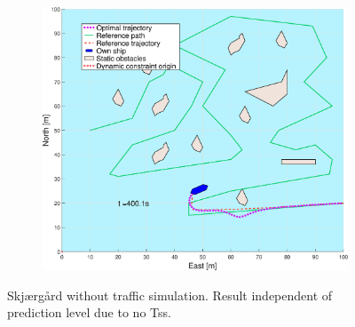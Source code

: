 \begin{figure}[!ht]
\begin{subfigure}[b]{0.494\textwidth}
        \subcaption{}
    \end{subfigure}
    \hfill
    \begin{subfigure}[b]{0.494\textwidth}
        \centering
        \includegraphics[width=\textwidth]{Images/Figures/skjergard_u_trafikk/_Simple_0fig999_time=400}
        \subcaption{}
    \end{subfigure}
    \hfill
    \caption{Skjærgård without traffic simulation. Result independent of prediction level due to no \gls{Ts}s.}
\end{figure}%
